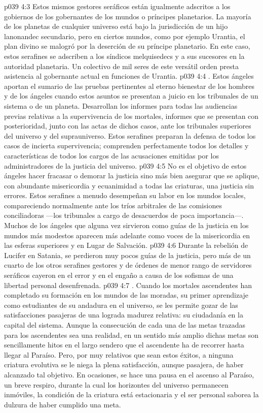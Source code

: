 \vs p039 4:3 Estos mismos gestores seráficos están igualmente adscritos a los gobiernos de los gobernantes de los mundos o príncipes planetarios. La mayoría de los planetas de cualquier universo está bajo la jurisdicción de un hijo lanonandec secundario, pero en ciertos mundos, como por ejemplo Urantia, el plan divino se malogró por la deserción de su príncipe planetario. En este caso, estos serafines se adscriben a los síndicos melquisedecs y a sus sucesores en la autoridad planetaria. Un colectivo de mil seres de este versátil orden presta asistencia al gobernante actual en funciones de Urantia.
\vs p039 4:4 . Estos ángeles aportan el sumario de las pruebas pertinentes al eterno bienestar de los hombres y de los ángeles cuando estos asuntos se presentan a juicio en los tribunales de un sistema o de un planeta. Desarrollan los informes para todas las audiencias previas relativas a la supervivencia de los mortales, informes que se presentan con posterioridad, junto con las actas de dichos casos, ante los tribunales superiores del universo y del suprauniverso. Estos serafines preparan la defensa de todos los casos de incierta supervivencia; comprenden perfectamente todos los detalles y características de todos los cargos de las acusaciones emitidas por los administradores de la justicia del universo.
\vs p039 4:5 No es el objetivo de estos ángeles hacer fracasar o demorar la justicia sino más bien asegurar que se aplique, con abundante misericordia y ecuanimidad a todas las criaturas, una justicia sin errores. Estos serafines a menudo desempeñan su labor en los mundos locales, compareciendo normalmente ante los tríos arbitrales de las comisiones conciliadoras ---los tribunales a cargo de desacuerdos de poca importancia---. Muchos de los ángeles que alguna vez sirvieron como guías de la justicia en los mundos más modestos aparecen más adelante como voces de la misericordia en las esferas superiores y en Lugar de Salvación.
\vs p039 4:6 Durante la rebelión de Lucifer en Satania, se perdieron muy pocos guías de la justicia, pero más de un cuarto de los otros serafines gestores y de órdenes de menor rango de servidores seráficos cayeron en el error y en el engaño a causa de los sofismas de una libertad personal desenfrenada.
\vs p039 4:7 . Cuando los mortales ascendentes han completado su formación en los mundos de las moradas, su primer aprendizaje como estudiantes de su andadura en el universo, se les permite gozar de las satisfacciones pasajeras de una lograda madurez relativa: su ciudadanía en la capital del sistema. Aunque la consecución de cada una de las metas trazadas para los ascendentes sea una realidad, en un sentido más amplio dichas metas son sencillamente hitos en el largo sendero que el ascendente ha de recorrer hasta llegar al Paraíso. Pero, por muy relativos que sean estos éxitos, a ninguna criatura evolutiva se le niega la plena satisfacción, aunque pasajera, de haber alcanzado tal objetivo. En ocasiones, se hace una pausa en el ascenso al Paraíso, un breve respiro, durante la cual los horizontes del universo permanecen inmóviles, la condición de la criatura está estacionaria y el ser personal saborea la dulzura de haber cumplido una meta.
